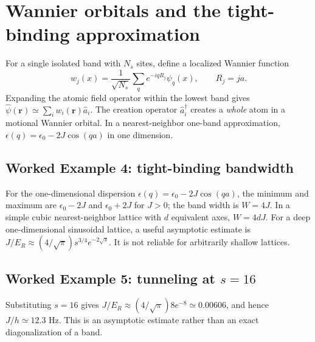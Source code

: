 \documentclass[11pt,a4paper]{article}
\newcommand{\ex}[1]{\subsection*{Worked Example #1}}
\begin{document}
\section{Wannier orbitals and the tight-binding approximation}
For a single isolated band with $N_s$ sites, define a localized Wannier function
\begin{equation}w_j(x)=\frac1{\sqrt{N_s}}\sum_q e^{-iqR_j}\psi_q(x),\qquad R_j=ja.\end{equation}
Expanding the atomic field operator within the lowest band gives $\hat\psi(\mathbf r)\simeq\sum_i w_i(\mathbf r)\hat a_i$. The creation operator $\hat a_i^\dagger$ creates a \emph{whole} atom in a motional Wannier orbital. In a nearest-neighbor one-band approximation, $\epsilon(q)=\epsilon_0-2J\cos(qa)$ in one dimension.
\begin{center}\end{center}
\ex{4: tight-binding bandwidth} For the one-dimensional dispersion $\epsilon(q)=\epsilon_0-2J\cos(qa)$, the minimum and maximum are $\epsilon_0-2J$ and $\epsilon_0+2J$ for $J>0$; the band width is $W=4J$. In a simple cubic nearest-neighbor lattice with $d$ equivalent axes, $W=4dJ$.
For a deep one-dimensional sinusoidal lattice, a useful asymptotic estimate is $J/E_R\approx(4/\sqrt\pi)s^{3/4}e^{-2\sqrt{s}}$. It is not reliable for arbitrarily shallow lattices.
\ex{5: tunneling at $s=16$} Substituting $s=16$ gives $J/E_R\approx(4/\sqrt\pi)8e^{-8}\simeq0.00606$, and hence $J/h\simeq12.3$ Hz. This is an asymptotic estimate rather than an exact diagonalization of a band.
\end{document}
